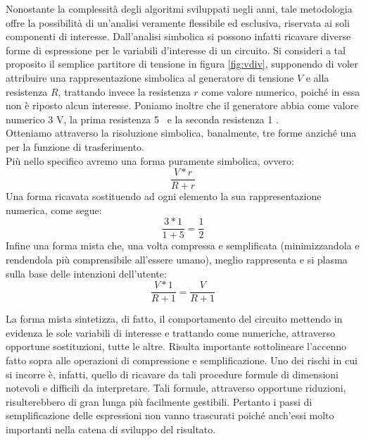 Nonostante la complessità degli algoritmi sviluppati negli anni, tale metodologia offre la possibilità di un'analisi veramente flessibile ed esclusiva, riservata ai soli componenti di interesse. Dall'analisi simbolica si possono infatti ricavare diverse forme di espressione per le variabili d'interesse di un circuito. Si consideri a tal proposito il semplice partitore di tensione in figura \ref{fig:vdiv}, supponendo di voler attribuire una rappresentazione simbolica al generatore di tensione $V$ e alla resistenza $R$, trattando invece la resistenza $r$ come valore numerico, poiché in essa non è riposto alcun interesse. Poniamo inoltre che il generatore abbia come valore numerico 3 V, la prima resistenza 5 \ohm\ e la seconda resistenza 1 \ohm.\\
Otteniamo attraverso la risoluzione simbolica, banalmente, tre forme anziché una per la funzione di trasferimento.\\
Più nello specifico avremo una forma puramente simbolica, ovvero: $$ \frac{V * r}{R + r} $$
Una forma ricavata sostituendo ad ogni elemento la sua rappresentazione numerica, come segue: $$ \frac{3 * 1}{1 + 5} = \frac{1}{2} $$
Infine una forma mista che, una volta compressa e semplificata (minimizzandola e rendendola più comprensibile all'essere umano), meglio rappresenta e si plasma sulla base delle intenzioni dell'utente: $$ \frac{V * 1}{R + 1} = \frac{V}{R + 1} $$

La forma mista sintetizza, di fatto, il comportamento del circuito mettendo in evidenza le sole variabili di interesse e trattando come numeriche, attraverso opportune sostituzioni, tutte le altre. Risulta importante sottolineare l'accenno fatto sopra alle operazioni di compressione e semplificazione. Uno dei rischi in cui si incorre è, infatti, quello di ricavare da tali procedure formule di dimensioni notevoli e difficili da interpretare. Tali formule, attraverso opportune riduzioni, risulterebbero di gran lunga più facilmente gestibili. Pertanto i passi di semplificazione delle espressioni non vanno trascurati poiché anch'essi molto importanti nella catena di sviluppo del risultato.

